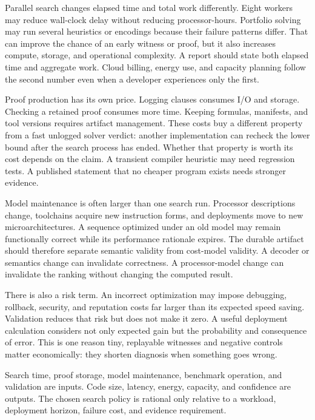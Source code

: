 Parallel search changes elapsed time and total work differently. Eight workers
may reduce wall-clock delay without reducing processor-hours. Portfolio
solving may run several heuristics or encodings because their failure patterns
differ. That can improve the chance of an early witness or proof, but it also
increases compute, storage, and operational complexity. A report should state
both elapsed time and aggregate work. Cloud billing, energy use, and capacity
planning follow the second number even when a developer experiences only the
first.

Proof production has its own price. Logging clauses consumes I/O and storage.
Checking a retained proof consumes more time. Keeping formulas, manifests, and
tool versions requires artifact management. These costs buy a different
property from a fast unlogged solver verdict: another implementation can
recheck the lower bound after the search process has ended. Whether that
property is worth its cost depends on the claim. A transient compiler
heuristic may need regression tests. A published statement that no cheaper
program exists needs stronger evidence.

Model maintenance is often larger than one search run. Processor descriptions
change, toolchains acquire new instruction forms, and deployments move to new
microarchitectures. A sequence optimized under an old model may remain
functionally correct while its performance rationale expires. The durable
artifact should therefore separate semantic validity from cost-model
validity. A decoder or semantics change can invalidate correctness. A
processor-model change can invalidate the ranking without changing the
computed result.

There is also a risk term. An incorrect optimization may impose debugging,
rollback, security, and reputation costs far larger than its expected speed
saving. Validation reduces that risk but does not make it zero. A useful
deployment calculation considers not only expected gain but the probability
and consequence of error. This is one reason tiny, replayable witnesses and
negative controls matter economically: they shorten diagnosis when something
goes wrong.

\begin{archive}[title={Optimization has a balance sheet}]
Search time, proof storage, model maintenance, benchmark operation, and
validation are inputs. Code size, latency, energy, capacity, and confidence are
outputs. The chosen search policy is rational only relative to a workload,
deployment horizon, failure cost, and evidence requirement.
\end{archive}

